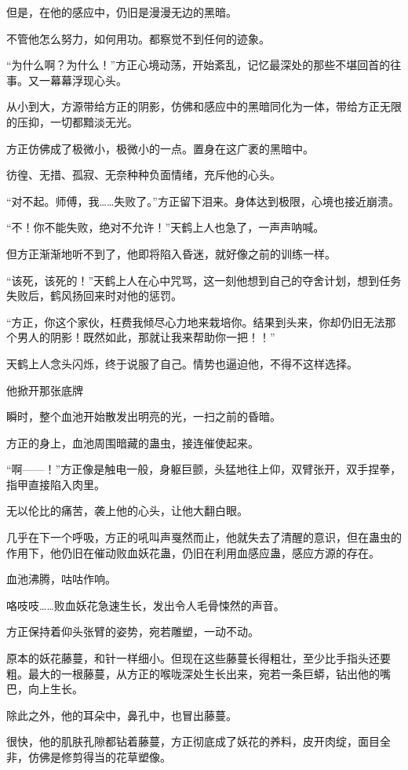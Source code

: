 \begin{this_body}
但是，在他的感应中，仍旧是漫漫无边的黑暗。

不管他怎么努力，如何用功。都察觉不到任何的迹象。

“为什么啊？为什么！”方正心境动荡，开始紊乱，记忆最深处的那些不堪回首的往事。又一幕幕浮现心头。

从小到大，方源带给方正的阴影，仿佛和感应中的黑暗同化为一体，带给方正无限的压抑，一切都黯淡无光。

方正仿佛成了极微小，极微小的一点。置身在这广袤的黑暗中。

彷徨、无措、孤寂、无奈种种负面情绪，充斥他的心头。

“对不起。师傅，我……失败了。”方正留下泪来。身体达到极限，心境也接近崩溃。

“不！你不能失败，绝对不允许！”天鹤上人也急了，一声声呐喊。

但方正渐渐地听不到了，他即将陷入昏迷，就好像之前的训练一样。

“该死，该死的！”天鹤上人在心中咒骂，这一刻他想到自己的夺舍计划，想到任务失败后，鹤风扬回来时对他的惩罚。

“方正，你这个家伙，枉费我倾尽心力地来栽培你。结果到头来，你却仍旧无法那个男人的阴影！既然如此，那就让我来帮助你一把！！”

天鹤上人念头闪烁，终于说服了自己。情势也逼迫他，不得不这样选择。

他掀开那张底牌

瞬时，整个血池开始散发出明亮的光，一扫之前的昏暗。

方正的身上，血池周围暗藏的蛊虫，接连催使起来。

“啊——！”方正像是触电一般，身躯巨颤，头猛地往上仰，双臂张开，双手捏拳，指甲直接陷入肉里。

无以伦比的痛苦，袭上他的心头，让他大翻白眼。

几乎在下一个呼吸，方正的吼叫声戛然而止，他就失去了清醒的意识，但在蛊虫的作用下，他仍旧在催动败血妖花蛊，仍旧在利用血感应蛊，感应方源的存在。

血池沸腾，咕咕作响。

咯吱吱……败血妖花急速生长，发出令人毛骨悚然的声音。

方正保持着仰头张臂的姿势，宛若雕塑，一动不动。

原本的妖花藤蔓，和针一样细小。但现在这些藤蔓长得粗壮，至少比手指头还要粗。最大的一根藤蔓，从方正的喉咙深处生长出来，宛若一条巨蟒，钻出他的嘴巴，向上生长。

除此之外，他的耳朵中，鼻孔中，也冒出藤蔓。

很快，他的肌肤孔隙都钻着藤蔓，方正彻底成了妖花的养料，皮开肉绽，面目全非，仿佛是修剪得当的花草塑像。


\end{this_body}
